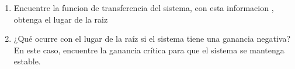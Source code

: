 \documentclass[
  11pt,
  letterpaper,
   addpoints,
   answers
  ]{exam}
\begin{document}
\begin{questions}
\begin{center}
\end{center}
    \begin{enumerate}
        \item Encuentre la funcion de transferencia del sistema, con esta informacion , obtenga el lugar de la raiz
        \item ¿Qué ocurre con el lugar de la raíz si el sistema tiene una ganancia negativa? En este caso, encuentre la ganancia crítica para que el sistema se mantenga estable.
    \end{enumerate}
\begin{solution}

\end{solution}
\end{questions}
\end{document}

